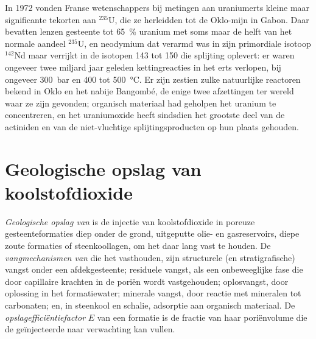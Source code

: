 \begin{history}
In 1972 vonden Franse wetenschappers bij metingen aan uraniumerts kleine maar significante tekorten aan
$^{235}$U, die ze herleidden tot de Oklo-mijn in Gabon. Daar bevatten lenzen gesteente tot
\qty{65}{\percent} uranium met soms maar de helft van het normale aandeel $^{235}$U, en neodymium
dat verarmd was in zijn primordiale isotoop $^{142}$Nd maar verrijkt in de isotopen 143 tot 150 die splijting
oplevert: er waren ongeveer twee miljard jaar geleden kettingreacties in het erts verlopen, bij ongeveer \qty{300}{bar}
en 400 tot \qty{500}{\celsius}. Er zijn zestien zulke natuurlijke reactoren bekend in Oklo en het nabije
Bangombé, de enige twee afzettingen ter wereld waar ze zijn gevonden; organisch materiaal had geholpen
het uranium te concentreren, en het uraniumoxide heeft sindsdien het grootste deel van de actiniden en van de
niet-vluchtige splijtingsproducten op hun plaats gehouden.
\end{history}

\section{Geologische opslag van koolstofdioxide}\label{sec:b2:energy-geology:ccs}

\begin{definition}\label{def:b2:energy-geology:ccs}
\emph{Geologische opslag van } is de injectie van
koolstofdioxide in poreuze gesteenteformaties diep onder de grond, uitgeputte olie- en gasreservoirs, diepe zoute
formaties of steenkoollagen, om het daar lang vast te houden. De
\emph{vangmechanismen van } die het vasthouden, zijn structurele (en stratigrafische)
vangst onder een afdekgesteente; residuele vangst, als een onbeweeglijke fase die door capillaire krachten in de poriën wordt vastgehouden;
oplosvangst, door oplossing in het formatiewater; minerale vangst, door reactie
met mineralen tot carbonaten; en, in steenkool en schalie, adsorptie aan organisch materiaal. De
\emph{opslagefficiëntiefactor} $E$ van een formatie is de fractie van haar poriënvolume die de geïnjecteerde
 naar verwachting kan vullen.
\end{definition}

